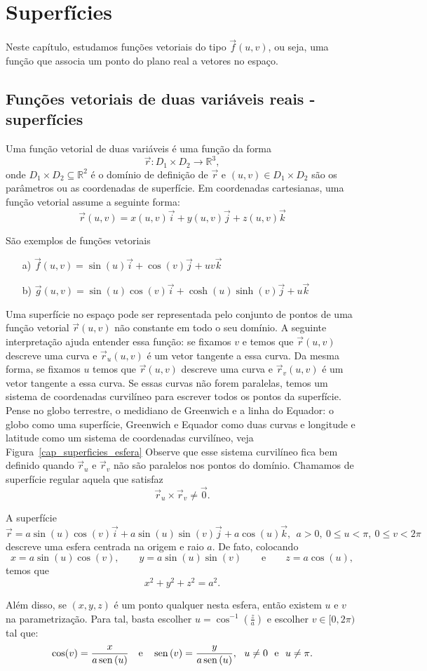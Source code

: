 \chapter{Superfícies}
Neste capítulo, estudamos funções vetoriais do tipo $\vec{f}(u,v)$, ou seja, uma função que associa um ponto do plano real a vetores no espaço.
\section{Funções vetoriais de duas variáveis reais - superfícies}
Uma função vetorial de duas variáveis é uma função da forma $$\vec{r}:D_1\times D_2 \to \mathbb{R}^3,$$ onde $D_1\times D_2\subseteq \mathbb{R}^2$ é o domínio de definição de $\vec{r}$ e $(u,v)\in D_1\times D_2$ são os parâmetros ou as coordenadas de superfície. Em coordenadas cartesianas, uma função vetorial assume a seguinte forma:
$$\vec{r}(u,v)=x(u,v)\vec{i}+y(u,v)\vec{j}+z(u,v)\vec{k}$$
\begin{ex}\label{exfv_1} São exemplos de funções vetoriais
\begin{itemize}
\item [a)] $\vec{f}(u,v)=\sin(u)\vec{i}+\cos(v)\vec{j}+uv\vec{k}$
\item [b)] $\vec{g}(u,v)=\sin(u)\cos(v) \vec{i}+\cosh(u)\sinh(v)\vec{j}+u\vec{k}$
\end{itemize}
\end{ex}
Uma superfície no espaço pode ser representada pelo conjunto de pontos de uma função vetorial $\vec{r}(u,v)$ não constante em todo o seu domínio. A seguinte interpretação ajuda entender essa função: se fixamos $v$ e temos que $\vec{r}(u,v)$ descreve uma curva e $\vec{r}_u(u,v)$ é um vetor tangente a essa curva. Da mesma forma, se fixamos $u$ temos que $\vec{r}(u,v)$ descreve uma curva e $\vec{r}_v(u,v)$ é um vetor tangente a essa curva. Se essas curvas não forem paralelas, temos um sistema de coordenadas curvilíneo para escrever todos os pontos da superfície. Pense no globo terrestre, o medidiano de Greenwich e a linha do Equador: o globo como uma superfície, Greenwich e Equador como duas curvas e longitude e latitude como um sistema de coordenadas curvilíneo, veja Figura~\ref{cap_superficies_esfera} Observe que esse sistema curvilíneo fica bem definido quando $\vec{r}_u$ e $\vec{r}_v$ não são paralelos nos pontos do domínio. Chamamos de superfície regular aquela que satisfaz
$$
\vec{r}_u\times \vec{r}_v\neq \vec{0}.
$$
\begin{ex}A superfície
$$
\vec{r}=a\sin(u)\cos(v)\vec{i}+a\sin(u)\sin(v)\vec{j}+a\cos(u)\vec{k},~~ a>0, ~ 0\leq u< \pi, ~ 0\leq v< 2\pi
$$
descreve uma esfera centrada na origem e raio $a$. De fato, colocando $$x=a\sin(u)\cos(v),\qquad y=a\sin(u)\sin(v)\qquad\text{e}\qquad z=a\cos(u),$$
temos que
$$
x^2+y^2+z^2=a^2.
$$
\end{ex}
Além disso, se $(x,y,z)$ é um ponto qualquer nesta esfera, então existem $u$ e $v$ na parametrização. Para tal, basta escolher $u=\cos^{-1}\left(\frac{z}{a}\right)$ e escolher $v\in[0,2\pi)$ tal que:
$$\cos(v)=\frac{x}{a\sin(u)} \quad \hbox{e} \quad \sin(v)=\frac{y}{a\sin(u)},~~u\neq 0 ~~ \hbox{e} ~~u\neq \pi.$$

